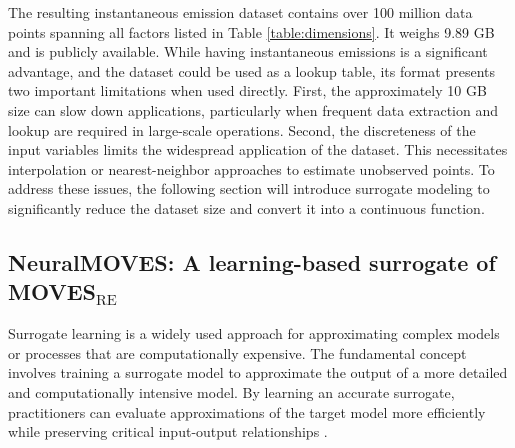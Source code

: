 \documentclass[12pt,english]{article}
\begin{document}
The resulting instantaneous emission dataset contains over 100 million data points spanning all factors listed in Table \ref{table:dimensions}. It weighs 9.89 GB and is publicly available. While having instantaneous emissions is a significant advantage, and the dataset could be used as a lookup table, its format presents two important limitations when used directly.
First, the approximately 10 GB size can slow down applications, particularly when frequent data extraction and lookup are required in large-scale operations. 
Second, the discreteness of the input variables limits the widespread application of the dataset.
This necessitates interpolation or nearest-neighbor approaches to estimate unobserved points.
To address these issues, the following section will introduce surrogate modeling to significantly reduce the dataset size and convert it into a continuous function. 






\subsection{NeuralMOVES: A learning-based surrogate of MOVES$_\text{RE}$}\label{sec:Surrogate}

Surrogate learning is a widely used approach for approximating complex models or processes that are computationally expensive. 
The fundamental concept involves training a surrogate model to approximate the output of a more detailed and computationally intensive model. 
By learning an accurate surrogate, practitioners can evaluate approximations of the target model more efficiently while preserving critical input-output relationships \citep{Cozad_2014}.
\end{document}
